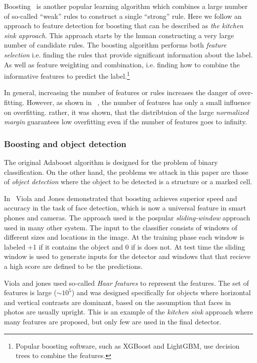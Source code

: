 \documentclass[11pt]{article}
\begin{document}
Boosting~\cite{FreundSc97,schapire2013boosting} is another popular
learning algorithm which combines a large number of so-called ``weak''
rules to construct a single ``strong'' rule. Here we follow an
approach to feature detection for boosting that can be described as
{\em the kitchen sink approach}. This approach starts by the human
constructing a very large number of candidate rules. The boosting
algorithm performs both {\em feature selection} i.e. finding the rules
that provide significant information about the label. As well as feature weighting and
combination, i.e. finding how to combine the informative features to
predict the label.\footnote{Popular boosting software, such as XGBoost and
  LightGBM, use decision trees to combine the features.}

In general, increasing the number of features or rules increases the
danger of over-fitting. However, as shown in ~\cite{SchapireFrBaLe98}, the
number of features has only a small influence on overfitting. rather,
it was shown, that the distribtuion of the large {\em normalized
  margin} guarantees low overfitting even if the number of features
goes to infinity.


\subsubsection{Boosting and object detection}
The original Adaboost algorithm is designed for the problem of binary
classification. On the other hand, the problems we attack in this
paper are those of {\em object detection} where the object to be
detected is a structure or a marked cell.

In~\cite{violajones01} Viola and Jones demonstrated that boosting
achieves superior speed and accuracy in the task of face detection,
which is now a universal feature in smart phones and cameras.  The
approach used is the pospular {\em sliding-window} approach used in
many other system.  The input to the classifier consists of windows of
different sizes and locations in the image. At the training phase each
window is labeled +1 if it contains the object and 0 if is does
not. At test time the sliding window is used to generate inputs for
the detector and windows that that recieve a high score are defined to
be the predictions.

Viola and jones used so-called {\em Haar features} to represent the
features. The set of features is large ($\sim 10^5$) and was designed
specifically for objects where horizontal and vertical contrasts are
dominant, based on the assumption that faces in photos are usually
upright. This is an example of the {\em kitchen sink} approach where
many features are proposed, but only few are used in the final detector.
\end{document}
